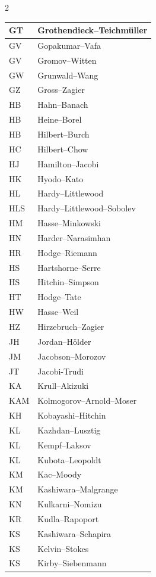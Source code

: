 \documentclass{amsart}
\numberwithin{equation}{section}
\theoremstyle{plain}
\numberwithin{equation}{section}
\theoremstyle{remark}
\begin{document}
\begin{multicols}{2}
{\begin{longtable}{l|l}
GT & Grothendieck--Teichmüller\\ \hline
GV & Gopakumar--Vafa\\ \hline
GV & Gromov--Witten\\ \hline
GW & Grunwald--Wang\\ \hline
GZ & Gross--Zagier\\ \hline
HB & Hahn--Banach\\ \hline
HB & Heine--Borel\\ \hline
HB & Hilbert--Burch\\ \hline
HC & Hilbert--Chow\\ \hline
HJ & Hamilton--Jacobi\\ \hline
HK & Hyodo--Kato\\ \hline
HL & Hardy--Littlewood\\ \hline
HLS & Hardy--Littlewood--Sobolev\\ \hline
HM & Hasse--Minkowski\\ \hline
HN & Harder--Narasimhan\\ \hline
HR & Hodge--Riemann\\ \hline
HS & Hartshorne--Serre\\ \hline
HS & Hitchin--Simpson\\ \hline
HT & Hodge--Tate\\ \hline
HW & Hasse--Weil\\ \hline
HZ & Hirzebruch--Zagier\\ \hline
JH & Jordan--Hölder\\ \hline
JM & Jacobson--Morozov\\ \hline
JT & Jacobi-Trudi\\ \hline
KA & Krull--Akizuki\\ \hline
KAM & Kolmogorov--Arnold--Moser\\ \hline
KH & Kobayashi--Hitchin\\ \hline
KL & Kazhdan--Lusztig \\ \hline
KL & Kempf--Laksov\\ \hline
KL & Kubota--Leopoldt\\ \hline
KM & Kac--Moody\\ \hline
KM & Kashiwara--Malgrange\\ \hline
KN & Kulkarni--Nomizu\\ \hline
KR & Kudla--Rapoport\\ \hline
KS & Kashiwara--Schapira\\ \hline
KS & Kelvin--Stokes\\ \hline
KS & Kirby--Siebenmann\\ \hline

\end{longtable}}
\end{multicols}
\end{document}
